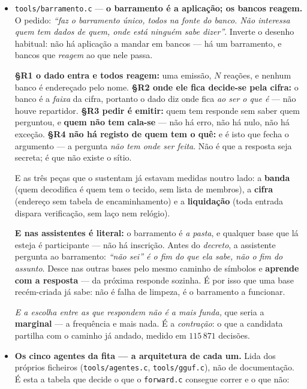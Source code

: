 \documentclass[11pt]{article}
\newcommand{\code}[1]{\texttt{\small #1}}
\theoremstyle{plain}
\theoremstyle{remark}
\begin{document}
\begin{itemize}
\item \code{tools/barramento.c} --- \textbf{o barramento é a aplicação; os bancos reagem.} O pedido: \emph{``faz o barramento único, todos na fonte do banco. Não interessa quem tem dados de quem, onde
está ninguém sabe dizer''}. Inverte o desenho habitual: não há aplicação a mandar em bancos --- há um
barramento, e bancos que \emph{reagem} ao que nele passa.

\textbf{§R1 o dado entra e todos reagem:} uma emissão, $N$ reações, e nenhum banco é endereçado pelo
nome. \textbf{§R2 onde ele fica decide-se pela cifra:} o banco é a \emph{faixa} da cifra, portanto o
dado diz onde fica \emph{ao ser o que é} --- não houve repartidor. \textbf{§R3 pedir é emitir:} quem
tem responde sem saber quem perguntou, e \textbf{quem não tem cala-se} --- não há erro, não há nulo,
não há exceção. \textbf{§R4 não há registo de quem tem o quê:} e é isto que fecha o argumento --- a
pergunta \emph{não tem onde ser feita}. Não é que a resposta seja secreta; é que não existe o sítio.

E as três peças que o sustentam já estavam medidas noutro lado: a \textbf{banda} (quem decodifica é
quem tem o tecido, sem lista de membros), a \textbf{cifra} (endereço sem tabela de encaminhamento) e
a \textbf{liquidação} (toda entrada dispara verificação, sem laço nem relógio).

\textbf{E nas assistentes é literal:} o barramento é \emph{a pasta}, e qualquer base que lá esteja é
participante --- não há inscrição. Antes do \emph{decreto}, a assistente pergunta ao barramento:
\emph{``não sei'' é o fim do que ela sabe, não o fim do assunto}. Desce nas outras bases pelo mesmo
caminho de símbolos e \textbf{aprende com a resposta} --- da próxima responde sozinha. É por isso que
uma base recém-criada já sabe: não é falha de limpeza, é o barramento a funcionar.

\emph{E a escolha entre as que respondem não é a mais funda,} que seria a \textbf{marginal} --- a
frequência e mais nada. É a \emph{contração}: o que a candidata partilha com o caminho já andado,
medido em $115\,871$ decisões.

\item \textbf{Os cinco agentes da fita --- a arquitetura de cada um.} Lida dos próprios ficheiros
(\code{tools/agentes.c}, \code{tools/gguf.c}), não de documentação. É esta a tabela que decide o que
o \code{forward.c} consegue correr e o que não:


\end{itemize}
\end{document}

